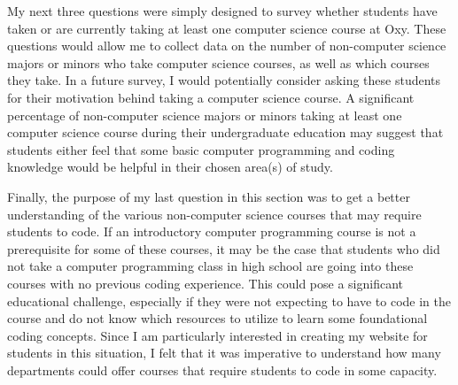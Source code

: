 \documentclass[10pt,twocolumn]{article}
\begin{document}
My next three questions were simply designed to survey whether students have taken or are currently taking at least one computer science course at Oxy. These questions would allow me to collect data on the number of non-computer science majors or minors who take computer science courses, as well as which courses they take. In a future survey, I would potentially consider asking these students for their motivation behind taking a computer science course. A significant percentage of non-computer science majors or minors taking at least one computer science course during their undergraduate education may suggest that students either feel that some basic computer programming and coding knowledge would be helpful in their chosen area(s) of study. 

Finally, the purpose of my last question in this section was to get a better understanding of the various non-computer science courses that may require students to code. If an introductory computer programming course is not a prerequisite for some of these courses, it may be the case that students who did not take a computer programming class in high school are going into these courses with no previous coding experience. This could pose a significant educational challenge, especially if they were not expecting to have to code in the course and do not know which resources to utilize to learn some foundational coding concepts. Since I am particularly interested in creating my website for students in this situation, I felt that it was imperative to understand how many departments could offer courses that require students to code in some capacity.
\end{document}
